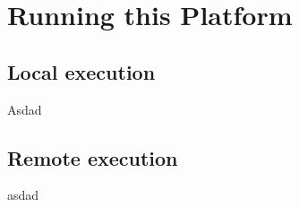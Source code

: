 
\section{Running this Platform}

\subsection{Local execution}

Asdad

\subsection{Remote execution}

asdad
